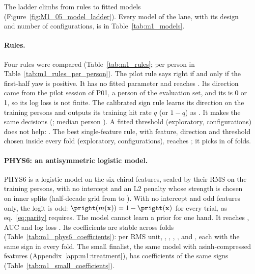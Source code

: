 The ladder climbs from rules to fitted models (Figure~\ref{fig:M1_05_model_ladder}). Every model of
the lane, with its design and number of configurations, is in Table~\ref{tab:m1_models}.

\paragraph{Rules.} Four rules were compared (Table~\ref{tab:m1_rules}; per person in
Table~\ref{tab:m1_rules_per_person}). The pilot rule says right if and only if the first-half yaw is
positive. It has no fitted parameter and reaches . Its direction came from
the pilot session of P01, a person of the evaluation set, and its \pright{} is 0 or 1, so its log
loss is not finite. The calibrated sign rule learns its direction on the training persons and outputs
its training hit rate $q$ (or $1-q$) as \pright{}. It makes the same decisions
(; median person ). A fitted
threshold (exploratory,  configurations) does not help:
. The best single-feature rule, with feature, direction and threshold
chosen inside every fold (exploratory,  configurations), reaches
; it picks  in  of
 folds.


\paragraph{PHYS6: an antisymmetric logistic model.} PHYS6 is a logistic model on the six chiral
features, scaled by their RMS on the training persons, with no intercept and an L2 penalty whose
strength is chosen on inner splits (half-decade grid from  to ).
With no intercept and odd features only, the logit is odd: $\pright(m(\mathbf x)) = 1-\pright(\mathbf x)$
for every trial, as eq.~\eqref{eq:parity} requires. The model cannot learn a prior for one hand. It
reaches , AUC  and log loss . Its
coefficients are stable across folds (Table~\ref{tab:m1_phys6_coefficients}): per RMS unit,
 ,  ,
 ,  ,
  and  , each
with the same sign in every fold. The small finalist, the same model with asinh-compressed features
(Appendix~\ref{app:m1:treatment}), has coefficients of the same signs
(Table~\ref{tab:m1_small_coefficients}).

